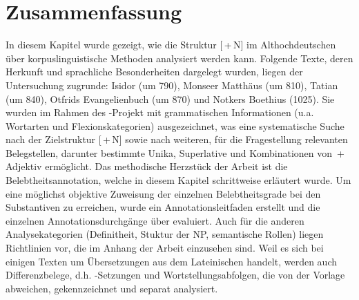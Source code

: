 \section{Zusammenfassung}

In diesem Kapitel wurde gezeigt, wie die Struktur [\,+\,N] im Althochdeutschen über korpuslinguistische Methoden analysiert werden kann. Folgende Texte, deren Herkunft und sprachliche Besonderheiten dargelegt wurden, liegen der Untersuchung zugrunde: Isidor (um 790), Monseer Matthäus (um 810), Tatian (um 840), Otfrids Evangelienbuch (um 870) und Notkers Boethius (1025). Sie wurden im Rahmen des -Projekt mit grammatischen Informationen (u.a. Wortarten und Flexionskategorien) ausgezeichnet, was eine systematische Suche nach der Zielstruktur [\,+\,N] sowie nach weiteren, für die Fragestellung relevanten Belegstellen, darunter bestimmte Unika, Superlative und Kombinationen von \,+\,Adjektiv ermöglicht. Das methodische Herzstück der Arbeit ist die Belebtheitsannotation, welche in diesem Kapitel schrittweise erläutert wurde. Um eine möglichst objektive Zuweisung der einzelnen Belebtheitsgrade bei den Substantiven zu erreichen, wurde ein Annotationsleitfaden erstellt und die einzelnen Annotationsdurchgänge über  evaluiert. Auch für die anderen Analysekategorien (Definitheit, Stuktur der NP, semantische Rollen) liegen Richtlinien vor, die im Anhang \parencite{HZKYL4_2020} der Arbeit einzusehen sind. Weil es sich bei einigen Texten um Übersetzungen aus dem Lateinischen handelt, werden auch Differenzbelege, d.h. -Setzungen  und Wortstellungsabfolgen, die von der Vorlage abweichen, gekennzeichnet und separat analysiert. 
  
